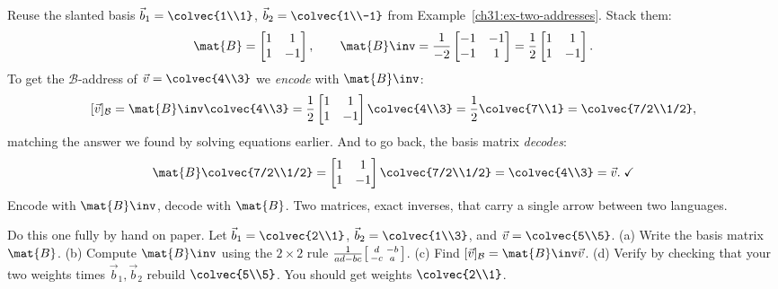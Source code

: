 \begin{example}
\label{ch31:ex-translate}
Reuse the slanted basis $\vec{b}_1=\colvec{1\\1}$, $\vec{b}_2=\colvec{1\\-1}$ from
Example~\ref{ch31:ex-two-addresses}. Stack them:
\[
  \mat{B} = \begin{bmatrix} 1 & 1\\ 1 & -1\end{bmatrix},
  \qquad
  \mat{B}\inv = \frac{1}{-2}\begin{bmatrix} -1 & -1\\ -1 & 1\end{bmatrix}
  = \frac12\begin{bmatrix} 1 & 1\\ 1 & -1\end{bmatrix}.
\]
To get the $\mathcal{B}$-address of $\vec{v}=\colvec{4\\3}$ we \emph{encode} with
$\mat{B}\inv$:
\[
  [\vec{v}]_{\mathcal{B}} = \mat{B}\inv\colvec{4\\3}
  = \frac12\begin{bmatrix} 1 & 1\\ 1 & -1\end{bmatrix}\colvec{4\\3}
  = \frac12\colvec{7\\1} = \colvec{7/2\\1/2},
\]
matching the answer we found by solving equations earlier. And to go back, the
basis matrix \emph{decodes}:
\[
  \mat{B}\colvec{7/2\\1/2} = \begin{bmatrix} 1 & 1\\ 1 & -1\end{bmatrix}\colvec{7/2\\1/2}
  = \colvec{4\\3} = \vec{v}.\;\checkmark
\]
Encode with $\mat{B}\inv$, decode with $\mat{B}$. Two matrices, exact inverses,
that carry a single arrow between two languages.
\end{example}

\begin{labbox}
Do this one fully by hand on paper. Let
$\vec{b}_1=\colvec{2\\1}$, $\vec{b}_2=\colvec{1\\3}$, and $\vec{v}=\colvec{5\\5}$.
(a) Write the basis matrix $\mat{B}$. (b) Compute $\mat{B}\inv$ using the
$2\times2$ rule $\frac{1}{ad-bc}\begin{bsmallmatrix} d & -b\\ -c & a\end{bsmallmatrix}$.
(c) Find $[\vec{v}]_{\mathcal{B}}=\mat{B}\inv\vec{v}$. (d) Verify by checking that
your two weights times $\vec{b}_1,\vec{b}_2$ rebuild $\colvec{5\\5}$. You should
get weights $\colvec{2\\1}$.
\end{labbox}

